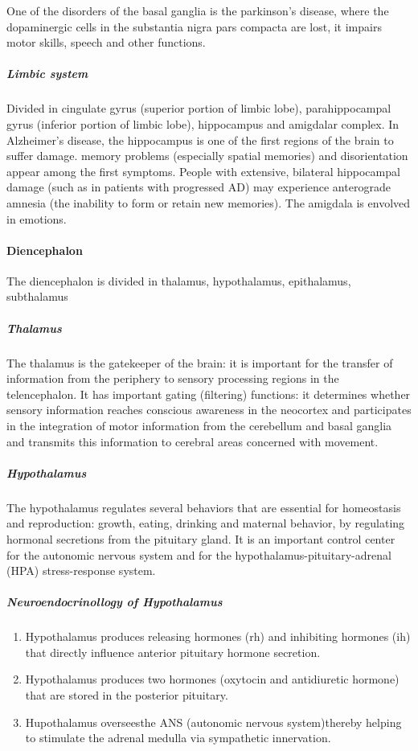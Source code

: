\documentclass[12pt,article,oneside,a4paper]{memoir}
\begin{document}
One of the disorders of the basal ganglia is the parkinson's disease, where the dopaminergic cells in the substantia nigra pars compacta are lost, it impairs motor skills, speech and other functions.

\subparagraph{Limbic system}
Divided in cingulate gyrus (superior portion of limbic lobe), parahippocampal gyrus (inferior portion of limbic lobe), hippocampus and amigdalar complex.
In Alzheimer's disease, the hippocampus is one of the first regions of the brain to suffer damage. memory problems (especially spatial memories) and disorientation appear among the first symptoms. People with extensive, bilateral hippocampal damage (such as in patients with progressed AD) may experience anterograde amnesia (the inability to form or retain new memories).
The amigdala is envolved in emotions.

\paragraph{Diencephalon}
The diencephalon is divided in thalamus, hypothalamus, epithalamus, subthalamus

\subparagraph{Thalamus}
The thalamus is the gatekeeper of the brain: it is important for the transfer of information from the periphery to sensory processing regions in the telencephalon. It has important gating (filtering) functions: it determines whether sensory information reaches conscious awareness in the neocortex and participates in the integration of motor information from the cerebellum and basal ganglia and transmits this information to cerebral areas concerned with movement.

\subparagraph{Hypothalamus}
The hypothalamus regulates several behaviors that are essential for homeostasis
and reproduction: growth, eating, drinking and maternal behavior, by regulating hormonal secretions from the pituitary gland. It is an important control center for the autonomic nervous system and for the hypothalamus-pituitary-adrenal (HPA) stress-response system.

\subparagraph{Neuroendocrinollogy of Hypothalamus}
\begin{enumerate}
\item Hypothalamus produces releasing hormones (rh) and inhibiting hormones (ih) that directly influence anterior pituitary hormone secretion.
\item Hypothalamus produces two hormones (oxytocin and antidiuretic hormone) that are stored in the posterior pituitary.
\item Hupothalamus overseesthe ANS (autonomic nervous system)thereby helping to stimulate the adrenal medulla via sympathetic innervation.
\end{enumerate}
\end{document}
